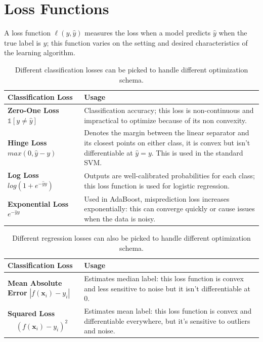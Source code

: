 \section{Loss Functions}
A loss function $\ell(y, \hat{y})$ measures the loss when a model predicts $\hat{y}$ when the true label is $y$; this function varies on the setting and desired characteristics of the learning algorithm.  

\begin{table}[ht] 
\centering
  \selectfont
  \begin{tabular}{p{0.3\linewidth} | p{0.7\linewidth}}
    \toprule
    Classification Loss & Usage \\
    \midrule
    \textbf{Zero-One Loss} $\mathbb{1}[y\not=\hat{y}]$ & Classification accuracy; this loss is non-continuous and impractical to optimize because of its non convexity. \\
    \textbf{Hinge Loss} $max(0, \hat{y} - y)$ & Denotes the margin between the linear separator and its closest points on either class, it is convex but isn't differentiable at $\hat{y}=y$.  This is used in the standard SVM. \\
    \textbf{Log Loss} $log(1 + e^{-\hat{y}y})$ & Outputs are well-calibrated probabilities for each class; this loss function is used for logistic regression. \\
    \textbf{Exponential Loss} $e^{-\hat{y}y}$ & Used in AdaBoost, misprediction loss increases exponentially: this can converge quickly or cause issues when the data is noisy. \\
    \bottomrule
  \end{tabular}
  \caption{Different classification losses can be picked to handle different optimization schema.}
  \label{tab:normaltab}
\end{table}

\begin{table}[ht] %
  \centering
  \selectfont
  \begin{tabular}{p{0.3\linewidth} | p{0.7\linewidth}}
    \toprule
    Classification Loss & Usage \\
    \midrule
    \textbf{Mean Absolute Error} $\left|f\left(\mathbf{x}_{i}\right)-y_{i}\right|$ & Estimates median label: this loss function is convex and less sensitive to noise but it isn't differentiable at 0. \\
    \textbf{Squared Loss} $\begin{aligned}
&\left(f\left(\mathbf{x}_{i}\right)-y_{i}\right)^{2} 
\end{aligned}$ & Estimates mean label: this loss function is convex and differentiable everywhere, but it's sensitive to outliers and noise. \\
    \bottomrule
  \end{tabular}
  \caption{Different regression losses can also be picked to handle different optimization schema.}
  \label{tab:othertab}
\end{table}

